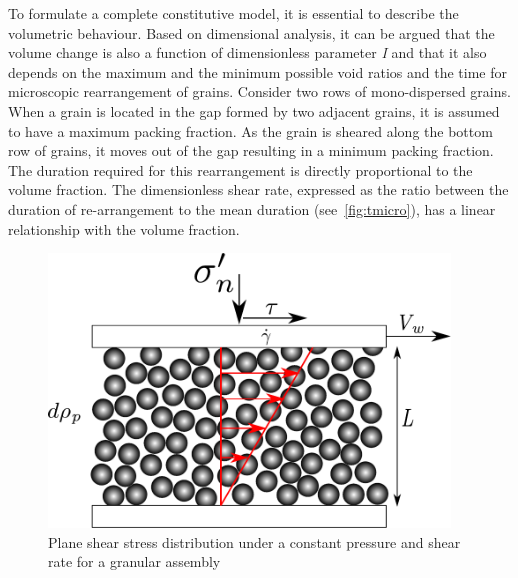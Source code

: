 To formulate a 
complete constitutive model, it is essential to describe the volumetric 
behaviour. Based on dimensional analysis, it can be argued that the volume 
change is also a function of dimensionless parameter \textit{I} and that it 
also depends on the maximum and the minimum possible void ratios and the time 
for microscopic rearrangement of grains. Consider two rows of mono-dispersed 
grains. When a grain is located in the gap formed by two adjacent grains, it is 
assumed to have a maximum packing fraction. As the grain is sheared along the 
bottom row of grains, it moves out of the gap resulting in 
a minimum packing fraction. The duration required for this rearrangement is 
directly proportional to the volume fraction. The dimensionless shear rate, 
expressed as the ratio between the duration of re-arrangement to the mean 
duration (see~\cref{fig:tmicro}), has a linear relationship with the volume 
fraction.

\begin{figure}[tbhp]
\centering
\includegraphics[width=0.95\textwidth]{Rheology}
\caption{Plane shear stress distribution under a constant pressure and shear 
rate for a granular assembly}
\label{fig:rheology}
\end{figure}

